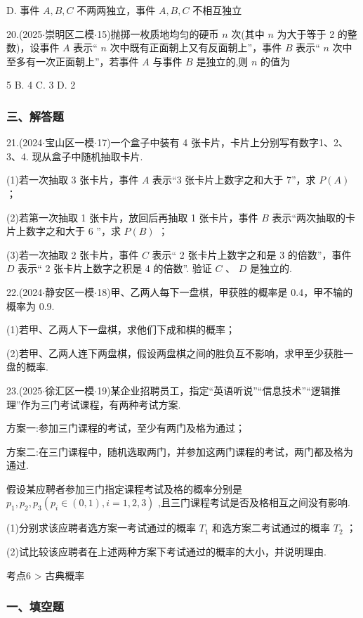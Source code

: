 D. 事件 $A,B,C$ 不两两独立，事件 $A,B,C$ 不相互独立

20.(2025$\cdot$崇明区二模$\cdot$15)抛掷一枚质地均匀的硬币 $n$ 次(其中 $n$ 为大于等于 2 的整数)，设事件 $A$ 表示“ $n$ 次中既有正面朝上又有反面朝上”，事件 $B$ 表示“ $n$ 次中至多有一次正面朝上”，若事件 $A$ 与事件 $B$ 是独立的,则 $n$ 的值为 \dotfill{(\kh{})}

\xx{}{}{}{}5 B. 4 C. 3 D. 2

\subsubsection*{三、解答题}

21.(2024$\cdot$宝山区一模$\cdot$17)一个盒子中装有 4 张卡片，卡片上分别写有数字1、2、3、4. 现从盒子中随机抽取卡片.

(1)若一次抽取 3 张卡片，事件 $A$ 表示“3 张卡片上数字之和大于 7”，求 $P\left( A\right)$ ；

(2)若第一次抽取 1 张卡片，放回后再抽取 1 张卡片，事件 $B$ 表示“两次抽取的卡片上数字之和大于 6 ”，求 $P\left( B\right)$ ；

(3)若一次抽取 2 张卡片，事件 $C$ 表示“ 2 张卡片上数字之和是 3 的倍数”，事件 $D$ 表示“ 2 张卡片上数字之积是 4 的倍数”. 验证 $C$ 、 $D$ 是独立的.

22.(2024$\cdot$静安区一模$\cdot$18)甲、乙两人每下一盘棋，甲获胜的概率是 0.4，甲不输的概率为 0.9.

(1)若甲、乙两人下一盘棋，求他们下成和棋的概率；

(2)若甲、乙两人连下两盘棋，假设两盘棋之间的胜负互不影响，求甲至少获胜一盘的概率.

23.(2025$\cdot$徐汇区一模$\cdot$19)某企业招聘员工，指定“英语听说”“信息技术”“逻辑推理”作为三门考试课程，有两种考试方案.

方案一:参加三门课程的考试，至少有两门及格为通过；

方案二:在三门课程中，随机选取两门，并参加这两门课程的考试，两门都及格为通过.

假设某应聘者参加三门指定课程考试及格的概率分别是 ${p}_{1},{p}_{2},{p}_{3}\left( {{p}_{i} \in  \left( {0,1}\right) ,i = 1,2,3}\right)$ ,且三门课程考试是否及格相互之间没有影响.

(1)分别求该应聘者选方案一考试通过的概率 ${T}_{1}$ 和选方案二考试通过的概率 ${T}_{2}$ ；

(2)试比较该应聘者在上述两种方案下考试通过的概率的大小，并说明理由.

考点6 > 古典概率

\subsubsection*{一、填空题}

